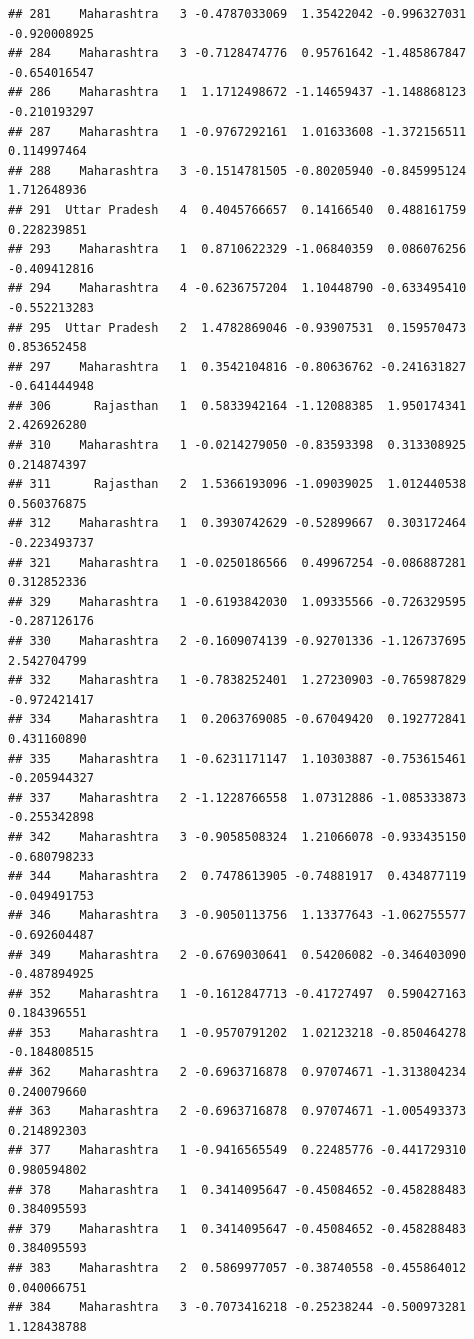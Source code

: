 \documentclass[
]{article}
\begin{document}
\begin{verbatim}
## 281    Maharashtra   3 -0.4787033069  1.35422042 -0.996327031 -0.920008925
## 284    Maharashtra   3 -0.7128474776  0.95761642 -1.485867847 -0.654016547
## 286    Maharashtra   1  1.1712498672 -1.14659437 -1.148868123 -0.210193297
## 287    Maharashtra   1 -0.9767292161  1.01633608 -1.372156511  0.114997464
## 288    Maharashtra   3 -0.1514781505 -0.80205940 -0.845995124  1.712648936
## 291  Uttar Pradesh   4  0.4045766657  0.14166540  0.488161759  0.228239851
## 293    Maharashtra   1  0.8710622329 -1.06840359  0.086076256 -0.409412816
## 294    Maharashtra   4 -0.6236757204  1.10448790 -0.633495410 -0.552213283
## 295  Uttar Pradesh   2  1.4782869046 -0.93907531  0.159570473  0.853652458
## 297    Maharashtra   1  0.3542104816 -0.80636762 -0.241631827 -0.641444948
## 306      Rajasthan   1  0.5833942164 -1.12088385  1.950174341  2.426926280
## 310    Maharashtra   1 -0.0214279050 -0.83593398  0.313308925  0.214874397
## 311      Rajasthan   2  1.5366193096 -1.09039025  1.012440538  0.560376875
## 312    Maharashtra   1  0.3930742629 -0.52899667  0.303172464 -0.223493737
## 321    Maharashtra   1 -0.0250186566  0.49967254 -0.086887281  0.312852336
## 329    Maharashtra   1 -0.6193842030  1.09335566 -0.726329595 -0.287126176
## 330    Maharashtra   2 -0.1609074139 -0.92701336 -1.126737695  2.542704799
## 332    Maharashtra   1 -0.7838252401  1.27230903 -0.765987829 -0.972421417
## 334    Maharashtra   1  0.2063769085 -0.67049420  0.192772841  0.431160890
## 335    Maharashtra   1 -0.6231171147  1.10303887 -0.753615461 -0.205944327
## 337    Maharashtra   2 -1.1228766558  1.07312886 -1.085333873 -0.255342898
## 342    Maharashtra   3 -0.9058508324  1.21066078 -0.933435150 -0.680798233
## 344    Maharashtra   2  0.7478613905 -0.74881917  0.434877119 -0.049491753
## 346    Maharashtra   3 -0.9050113756  1.13377643 -1.062755577 -0.692604487
## 349    Maharashtra   2 -0.6769030641  0.54206082 -0.346403090 -0.487894925
## 352    Maharashtra   1 -0.1612847713 -0.41727497  0.590427163  0.184396551
## 353    Maharashtra   1 -0.9570791202  1.02123218 -0.850464278 -0.184808515
## 362    Maharashtra   2 -0.6963716878  0.97074671 -1.313804234  0.240079660
## 363    Maharashtra   2 -0.6963716878  0.97074671 -1.005493373  0.214892303
## 377    Maharashtra   1 -0.9416565549  0.22485776 -0.441729310  0.980594802
## 378    Maharashtra   1  0.3414095647 -0.45084652 -0.458288483  0.384095593
## 379    Maharashtra   1  0.3414095647 -0.45084652 -0.458288483  0.384095593
## 383    Maharashtra   2  0.5869977057 -0.38740558 -0.455864012  0.040066751
## 384    Maharashtra   3 -0.7073416218 -0.25238244 -0.500973281  1.128438788

\end{verbatim}
\end{document}
